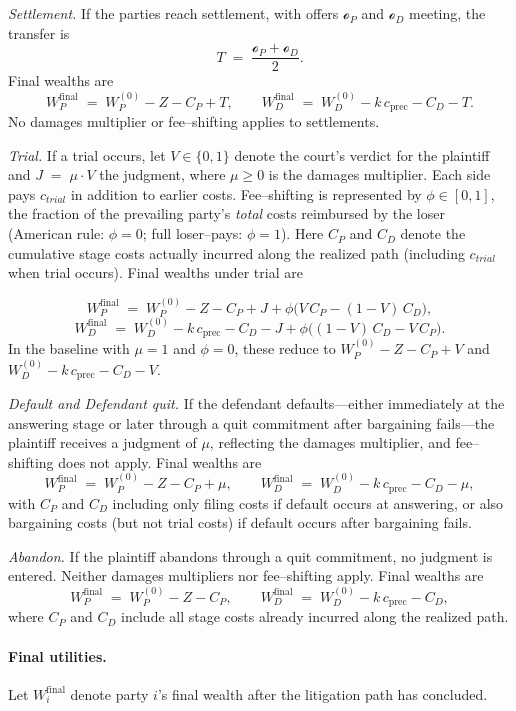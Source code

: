 \documentclass{article}
\begin{document}
\emph{Settlement.} If the parties reach settlement, with offers $\mathcal{o}_P$ and $\mathcal{o}_D$ meeting, the transfer is
\[
T \;=\; \frac{\mathcal{o}_P+\mathcal{o}_D}{2}.
\]
Final wealths are
\[
W_P^{\mathrm{final}} \;=\; W_P^{(0)} - Z - C_P + T,
\qquad
W_D^{\mathrm{final}} \;=\; W_D^{(0)} - k\,c_{\mathrm{prec}} - C_D - T.
\]
No damages multiplier or fee–shifting applies to settlements.

\emph{Trial.} If a trial occurs, let $V\in\{0,1\}$ denote the court’s verdict for the plaintiff and $J \;=\; \mu \cdot V$ the judgment, where $\mu\ge 0$ is the damages multiplier. Each side pays $c_{trial}$ in addition to earlier costs. Fee–shifting is represented by $\phi\in[0,1]$, the fraction of the prevailing party’s \emph{total} costs reimbursed by the loser (American rule: $\phi=0$; full loser–pays: $\phi=1$). Here $C_P$ and $C_D$ denote the cumulative stage costs actually incurred along the realized path (including $c_{trial}$ when trial occurs). Final wealths under trial are

\[
W_P^{\mathrm{final}}
\;=\;
W_P^{(0)} - Z - C_P + J + \phi\bigl(V\,C_P - (1-V)\,C_D\bigr),
\]
\[
W_D^{\mathrm{final}}
\;=\;
W_D^{(0)} - k\,c_{\mathrm{prec}} - C_D - J + \phi\bigl((1-V)\,C_D - V\,C_P\bigr).
\]
In the baseline with $\mu=1$ and $\phi=0$, these reduce to $W_P^{(0)}-Z-C_P+V$ and $W_D^{(0)}-k\,c_{\mathrm{prec}}-C_D-V$.

\emph{Default and Defendant quit.} If the defendant defaults—either immediately at the answering stage or later through a quit commitment after bargaining fails—the plaintiff receives a judgment of $\mu$, reflecting the damages multiplier, and fee–shifting does not apply. Final wealths are
\[
W_P^{\mathrm{final}} \;=\; W_P^{(0)} - Z - C_P + \mu,
\qquad
W_D^{\mathrm{final}} \;=\; W_D^{(0)} - k\,c_{\mathrm{prec}} - C_D - \mu,
\]
with $C_P$ and $C_D$ including only filing costs if default occurs at answering, or also bargaining costs (but not trial costs) if default occurs after bargaining fails.

\emph{Abandon.} If the plaintiff abandons through a quit commitment, no judgment is entered. Neither damages multipliers nor fee–shifting apply. Final wealths are
\[
W_P^{\mathrm{final}} \;=\; W_P^{(0)} - Z - C_P,
\qquad
W_D^{\mathrm{final}} \;=\; W_D^{(0)} - k\,c_{\mathrm{prec}} - C_D,
\]
where $C_P$ and $C_D$ include all stage costs already incurred along the realized path.

\paragraph{Final utilities.}
Let $W_i^{\mathrm{final}}$ denote party $i$'s final wealth after the litigation path has concluded.
\end{document}
